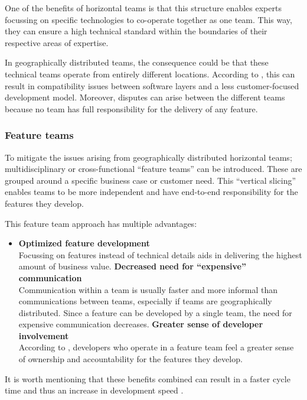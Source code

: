 One of the benefits of horizontal teams is that this structure enables experts
focussing on specific technologies to co-operate together as one team. This way,
they can ensure a high technical standard within the boundaries of their
respective areas of expertise.

In geographically distributed teams, the consequence could be that these
technical teams operate from entirely different locations. According to
\textcite{Smite_etal_2010}, this can result in compatibility issues between software
layers and a less customer-focused development model. Moreover, disputes can
arise between the different teams because no team has full responsibility for
the delivery of any feature.

\subsubsection{Feature teams}
\label{feature-teams}

To mitigate the issues arising from geographically distributed horizontal teams;
multidisciplinary or cross-functional ``feature teams'' can be introduced. These
are grouped around a specific business case or customer need. This ``vertical
slicing''  enables teams to be more independent and have end-to-end
responsibility for the features they develop.

This feature team approach has multiple advantages: \autocite{Smite_etal_2010}
\begin{itemize} 
  \item \textbf{Optimized feature development}\\
  Focussing on features instead of technical details aids in delivering the
  highest amount of business value.
  \spacedItem \textbf{Decreased need for ``expensive'' communication}\\
  Communication within a team is usually faster and more informal than
  communications between teams, especially if teams are geographically
  distributed. Since a feature can be developed by a single team, the need for
  expensive communication decreases.
  \spacedItem \textbf{Greater sense of developer involvement}\\
  According to \autocite{LarmanVodde_2008}, developers who operate in a feature
  team feel a greater sense of ownership and accountability for the features
  they develop. 
\end{itemize}

It is worth mentioning that these benefits combined can result in a faster cycle
time and thus an increase in development speed \autocite{Geers_2020}.

